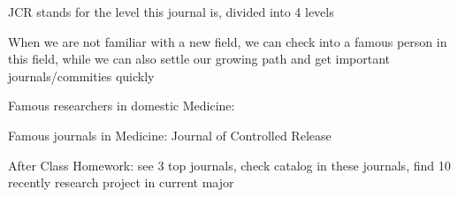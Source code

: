     JCR stands for the level this journal is, divided into 4 levels

    When we are not familiar with a new field, we can check into a famous person in this field, while we can also settle our growing path and get important journals/commities quickly

\begin{notation}
    Famous researchers in domestic Medicine: 

    Famous journals in Medicine: Journal of Controlled Release
\end{notation}

After Class Homework: see 3 top journals, check catalog in these journals, find 10 recently research project in current major
























